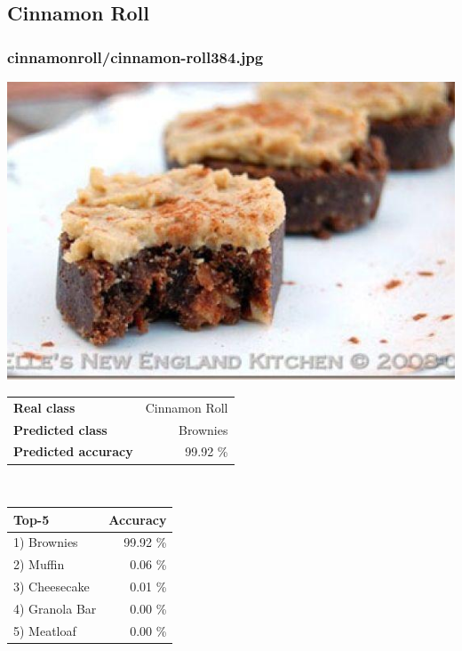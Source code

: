 \subsection{Cinnamon Roll}
    
\subsubsection{cinnamon\textunderscore roll/cinnamon-roll384.jpg}

\begin{minipage}[t]{0.4\textwidth}
	\vspace{0pt}
	\includegraphics[width=\linewidth]{images/evaluation-images/cinnamon_roll/cinnamon-roll384.jpg}
\end{minipage}
\hfill
\begin{minipage}[t]{0.5\textwidth}
	\vspace{0pt}\raggedright
	\begin{tabularx}{\textwidth}{X r}
		\small \textbf{Real class} & \small Cinnamon Roll\\
		\small \textbf{Predicted class} & \small Brownies\\
		\small \textbf{Predicted accuracy} & \small 99.92 \%
    \end{tabularx}\\
    
    \vspace{6pt}
	\begin{tabularx}{\textwidth}{X r}
        \small \textbf{Top-5} & \small \textbf{Accuracy} \\
        \hline
		\small 1) Brownies & \small 99.92 \%\\\small 2) Muffin & \small 0.06 \%\\\small 3) Cheesecake & \small 0.01 \%\\\small 4) Granola Bar & \small 0.00 \%\\\small 5) Meatloaf & \small 0.00 \%
    \end{tabularx}
\end{minipage}
    
